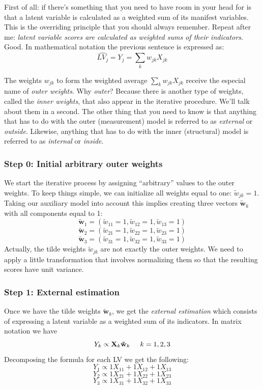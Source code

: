 \documentclass[12pt]{book}\usepackage{graphicx, color}
\begin{document}
First of all: if there's something that you need to have room in your head for is that a latent variable is calculated as a weighted sum of its manifest variables. This is the overriding principle that you should always remember. Repeat after me: \textit{latent variable scores are calculated as weighted sums of their indicators}. Good. In mathematical notation the previous sentence is expressed as:
$$\widehat{LV_j} = Y_j = \sum_{k} w_{jk} X_{jk}$$

The weights $w_{jk}$ to form the weighted average $\sum_{k} w_{jk} X_{jk}$ receive the especial name of \textit{outer weights}. Why \textit{outer}? Because there is another type of weights, called the \textit{inner weights}, that also appear in the iterative procedure. We'll talk about them in a second. The other thing that you need to know is that anything that has to do with the outer (measurement) model is referred to as \textit{external} or \textit{outside}. Likewise, anything that has to do with the inner (structural) model is referred to as \textit{internal} or \textit{inside}.


\subsubsection*{Step 0: Initial arbitrary outer weights}
We start the iterative process by assigning ``arbitrary'' values to the outer weights. To keep things simple, we can initialize all weights equal to one: $\tilde{w}_{jk}=1$. Taking our auxiliary model into account this implies creating three vectors $\mathbf{\tilde{w}}_k$ with all components equal to 1:
$$ \mathbf{\tilde{w}}_1 = (\tilde{w}_{11}=1, \tilde{w}_{12}=1, \tilde{w}_{13}=1) $$
$$ \mathbf{\tilde{w}}_2 = (\tilde{w}_{21}=1, \tilde{w}_{22}=1, \tilde{w}_{23}=1) $$
$$ \mathbf{\tilde{w}}_3 = (\tilde{w}_{31}=1, \tilde{w}_{32}=1, \tilde{w}_{33}=1) $$
Actually, the tilde weights $\tilde{w}_{jk}$ are not exactly the outer weights. We need to apply a little transformation that involves normalizing them so that the resulting scores have unit variance.

\subsubsection*{Step 1: External estimation}
Once we have the tilde weights $\mathbf{\tilde{w}}_k$, we get the \textit{external estimation} which consists of expressing a latent variable as a weighted sum of its indicators. In matrix notation we have
$$ Y_k \propto \mathbf{X}_k \mathbf{\tilde{w}}_k   \hspace{5mm}   k = 1, 2, 3  $$ 
Decomposing the formula for each LV we get the following:
$$ Y_1 \propto 1 X_{11} + 1 X_{12} + 1 X_{13} $$
$$ Y_2 \propto 1 X_{21} + 1 X_{22} + 1 X_{23} $$
$$ Y_3 \propto 1 X_{31} + 1 X_{32} + 1 X_{33} $$
\end{document}
